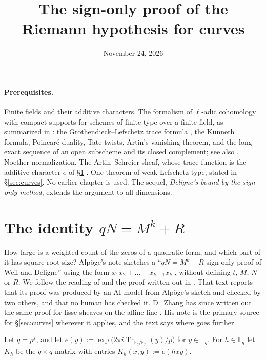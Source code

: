\documentclass[reqno]{amsart}
\title{The sign-only proof of the Riemann hypothesis for curves}
\author{}
\date{November 24, 2026}
\newcounter{chap}
\theoremstyle{definition}
\theoremstyle{plain}
\newcommand{\F}{\mathbb{F}}
\newcommand{\Tr}{\operatorname{Tr}}
\newcommand{\e}{e}
\begin{document}
\maketitle
{}\label{chap}

\paragraph{Prerequisites.}
Finite fields and their additive characters.  The formalism of \(\ell\)-adic cohomology with compact supports for schemes of finite type over a finite field, as summarized in \cite[Rapport]{SGA45}: the Grothendieck--Lefschetz trace formula \cite[Rapport, Th\'eor\`eme~3.2]{SGA45}, the K\"unneth formula, Poincar\'e duality, Tate twists, Artin's vanishing theorem, and the long exact sequence of an open subscheme and its closed complement; see also \cite{Mil}.  Noether normalization.  The Artin--Schreier sheaf, whose trace function is the additive character \(\e\) of \S\ref{sec:identity} \cite[Sommes trig.]{SGA45}.  One theorem of weak Lefschetz type, stated in \S\ref{sec:curves}.  No earlier chapter is used.  The sequel, \emph{Deligne's bound by the sign-only method}, extends the argument to all dimensions.

\section{The identity \texorpdfstring{\(qN = M^k + R\)}{qN = M\^{}k + R}}\label{sec:identity}

How large is a weighted count of the zeros of a quadratic form, and which part of it has square-root size?  Alpöge's note sketches a ``\(qN = M^k + R\) sign-only proof of Weil and Deligne'' using the form \(x_1x_2 + \dots + x_{k-1}x_k\) \cite[p.~2 and footnote~3]{Alp}, without defining \(t\), \(M\), \(N\) or \(R\).  We follow the reading of \cite[\S\S 2.8--2.9]{Dup} and the proof written out in \cite{Ald}.  That text reports that its proof was produced by an AI model from Alpöge's sketch and checked by two others, and that no human has checked it.  D.~Zhang has since written out the same proof for lisse sheaves on the affine line \cite{Zh}.  His note is the primary source for \S\ref{sec:curves} wherever it applies, and the text says where \cite{Ald} goes further.

Let \(q = p^f\), and let \(\e(y) := \exp\bigl(2\pi i \Tr_{\F_q/\F_p}(y)/p\bigr)\) for \(y \in \F_q\).  For \(h \in \F_q\) let \(K_h\) be the \(q \times q\) matrix with entries \(K_h(x,y) := \e(hxy)\).
\end{document}
